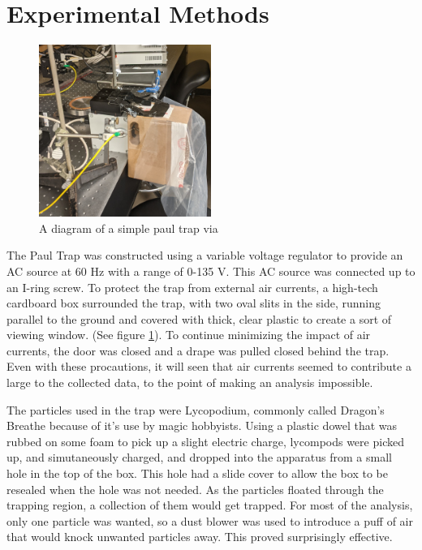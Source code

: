 \documentclass[12pt]{article}
\begin{document}

\section{Experimental Methods}
\begin{figure}[ht]
\centering
    \includegraphics[width=0.5\textwidth]{paul_trap.jpg}
	\caption{A diagram of a simple paul trap via \cite{pauly}}
    \label{fig:paul_trap}
\end{figure}

The Paul Trap was constructed using a variable voltage regulator to provide an AC source at 60 Hz with a range of 0-135 V. This AC source was connected up to an I-ring screw. To protect the trap from external air currents, a high-tech cardboard box surrounded the trap, with two oval slits in the side, running parallel to the ground and covered with thick, clear plastic to create a sort of viewing window. (See figure \ref{fig:paul_trap}). To continue minimizing the impact of air currents, the door was closed and a drape was pulled closed behind the trap. Even with these procautions, it will seen that air currents seemed to contribute a large to the collected data, to the point of making an analysis impossible. 

The particles used in the trap were Lycopodium, commonly called Dragon's Breathe because of it's use by magic hobbyists. Using a plastic dowel that was rubbed on some foam to pick up a slight electric charge, lycompods were picked up, and simutaneously charged, and dropped into the apparatus from a small hole in the top of the box. This hole had a slide cover to allow the box to be resealed when the hole was not needed. As the particles floated through the trapping region, a collection of them would get trapped. For most of the analysis, only one particle was wanted, so a dust blower was used to introduce a puff of air that would knock unwanted particles away. This proved surprisingly effective. 
\end{document}
